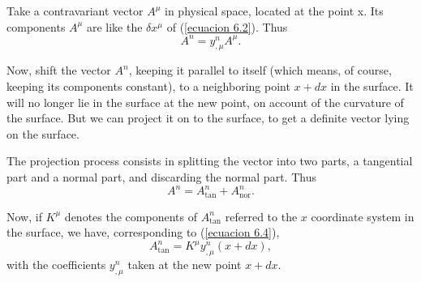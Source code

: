 Take a contravariant vector $A^\mu$ in physical space, located at the point x. Its components $A^\mu$ are like the $\delta x^\mu$ of (\ref{ecuacion 6.2}). Thus
\begin{equation}
 \label{ecuacion 6.4}
 A^n = y^n_{,\mu}A^\mu.
\end{equation}

Now, shift the vector $A^n$, keeping it parallel to itself (which means, of course, keeping its components constant), to a neighboring point $x + dx$ in the surface. It will no longer lie in the surface at the new point, on account of the curvature of the surface. But we can project it on to the surface, to get a definite vector lying on the surface.

The projection process consists in splitting the vector into two parts, a tangential part and a normal part, and discarding the normal part. Thus
\begin{equation}
 \label{ecuacion 6.5}
 A^n = A^n_{\mbox{tan}} + A^n_{\mbox{nor}}.
\end{equation}

Now, if $K^\mu$ denotes the components of $A^n_{\mbox{tan}}$ referred to the $x$ coordinate system in the surface, we have, corresponding to (\ref{ecuacion 6.4}),
\begin{equation}
 \label{ecuacion 6.6}
 A^n_{\mbox{tan}} = K^\mu y^n_{,\mu}(x + dx),
\end{equation}
with the coefficients $y^n_{,\mu}$ taken at the new point $x+ dx$.

